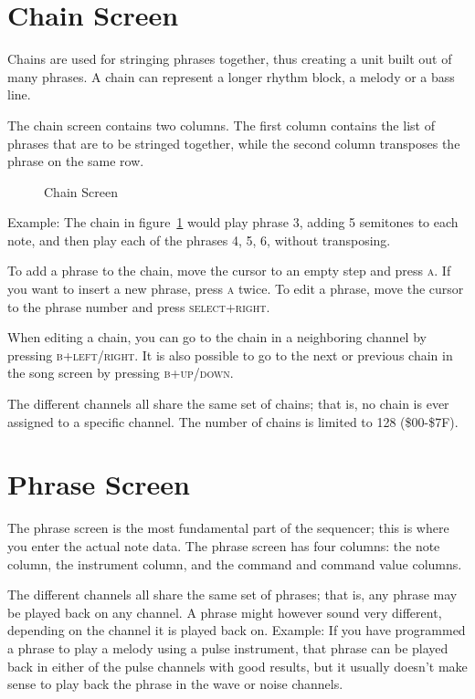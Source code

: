 \section{Chain Screen}
Chains are used for stringing phrases together, thus creating a unit built out of many
phrases. A chain can represent a longer rhythm block, a melody or a bass line.

The chain screen contains two columns. The first column contains the list of phrases that are
to be stringed together, while the second column transposes the phrase on the same row.

\begin{figure}[hbtp]
\centering
{}
\caption{Chain Screen}
\label{fig:chainexample}
\end{figure}

Example:
The chain in figure~\ref{fig:chainexample} would play phrase 3, adding 5 semitones to each note, and then play each of the phrases 4, 5, 6, without transposing.

To add a phrase to the chain, move the cursor to an empty step and press \textsc{a}. If you want to
insert a new phrase, press \textsc{a} twice. To edit a phrase, move the cursor to the phrase number
and press \textsc{select+right}.

When editing a chain, you can go to the chain in a neighboring channel by pressing \textsc{b+left/right}. It is also possible to go to the next or previous chain in the song screen by
pressing \textsc{b+up/down}.

The different channels all share the same set of chains; that is, no chain is ever assigned to a
specific channel. The number of chains is limited to 128 (\$00-\$7F).

\section{Phrase Screen}

\begin{figure}[hbtp]
\centering
{}
\end{figure}

The phrase screen is the most fundamental part of the sequencer; this is where you enter the actual note data. The phrase screen has four columns: the note column, the instrument column, and the command and command value columns.

The different channels all share the same set of phrases; that is, any phrase may be played back on any channel. A phrase might however sound very different, depending on the channel it is played back on. Example: If you have programmed a phrase to play a melody using a pulse instrument, that phrase can be played back in either of the pulse channels with good results, but it usually doesn't make sense to play back the phrase in the wave or noise channels.

